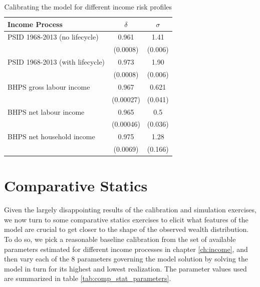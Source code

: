 \begin{table}
\begin{tabular}{l|c|c}

       Income Process            & $\delta$ & $\sigma$ \\
\hline                          
PSID 1968-2013 (no lifecycle)    &  0.961 & 1.41    \\
                  & \footnotesize{(0.0008)} & \footnotesize{(0.006)} \\ 
PSID 1968-2013 (with lifecycle)  &  0.973 & 1.90    \\
                  & \footnotesize{(0.0008)} & \footnotesize{(0.006)} \\
BHPS gross labour income         &  0.967 & 0.621    \\
                  & \footnotesize{(0.00027)} & \footnotesize{(0.041)} \\
BHPS net labour income           &  0.965 & 0.5    \\
                  & \footnotesize{(0.00046)} & \footnotesize{(0.036)} \\
BHPS net household income        &  0.975 & 1.28     \\
                  & \footnotesize{(0.0069)} & \footnotesize{(0.166)} \\

\end{tabular}
\caption{Calibrating the model for different income risk profiles}
\label{tab:calibration_results}
\end{table} 


\section{Comparative Statics}\label{sec:comp_stats}
Given the largely disappointing results of the calibration and simulation exercises,
we now turn to some comparative statics exercises to elicit what features of the 
model are crucial to get closer to the shape of the observed wealth distribution.
To do so, we pick a reasonable baseline calibration from the set of available 
parameters estimated for different income processes in chapter \ref{ch:income}, 
and then vary each of the 8 parameters governing the model solution by solving 
the model in turn for its highest and lowest realization. The parameter values
used are summarized in table \ref{tab:comp_stat_parameters}. 

